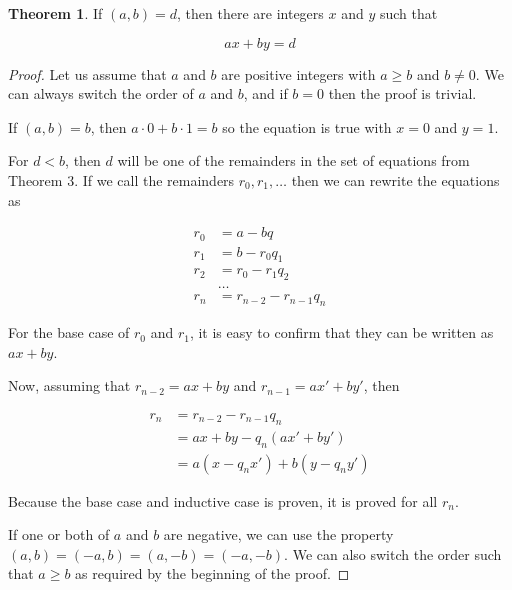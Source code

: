 \documentclass{article}
\theoremstyle{definition} %
\newtheorem{theorem}{Theorem}[section] %
\theoremstyle{definition}
\theoremstyle{definition}
\theoremstyle{definition}
\begin{document}
  \begin{theorem}
    If $(a, b) = d$, then there are integers $x$ and $y$ such that
    
    \begin{equation*}
      ax + by = d
    \end{equation*}
    \label{th:gcd_to_linear}
  \end{theorem}
  
  \begin{proof}
    Let us assume that $a$ and $b$ are positive integers with $a \geq b$ and $b \neq 0$.
    We can always switch the order of $a$ and $b$, and if $b = 0$ then the proof is trivial.
    
    If $(a, b) = b$, then $a \cdot 0 + b \cdot 1 = b$ so the equation is true with $x = 0$ and $y = 1$.
    
    For $d < b$, then $d$ will be one of the remainders in the set of equations from Theorem 3.
    If we call the remainders $r_0, r_1, \dots$ then we can rewrite the equations as
    
    \begin{align*}
      r_0 &= a - bq \\
      r_1 &= b - r_0q_1 \\
      r_2 &= r_0 - r_1q_2 \\
      &\dots \\
      r_n &= r_{n-2} - r_{n-1}q_n
    \end{align*}
    
    For the base case of $r_0$ and $r_1$, it is easy to confirm that they can be written as
    $ax + by$.
    
    Now, assuming that $r_{n-2} = ax + by$ and $r_{n-1} = ax' + by'$, then
    
    \begin{align*}
      r_n &= r_{n-2} - r_{n-1}q_n \\
      &= ax + by - q_n(ax' + by') \\
      &= a(x - q_nx') + b(y - q_ny')
    \end{align*}
    
    Because the base case and inductive case is proven, it is proved for all $r_n$.
    
    If one or both of $a$ and $b$ are negative, we can use the property $(a, b) = (-a, b) = (a, -b) = (-a, -b)$.
    We can also switch the order such that $a \geq b$ as required by the beginning of the proof.
  \end{proof}
  
\end{document}
